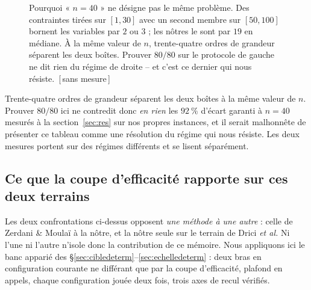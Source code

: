 \documentclass[11pt,a4paper]{article}
\theoremstyle{plain}
\theoremstyle{remark}
\newcommand{\confna}{\textsf{\footnotesize[\,sans mesure\,]}}
\begin{document}
\begin{figure}[H]
\centering
{}
\caption{Pourquoi « $n=40$ » ne désigne pas le même problème. Des
contraintes tirées sur $[1,30]$ avec un second membre sur $[50,100]$
bornent les variables par $2$ ou $3$ ; les nôtres le sont par $19$ en
médiane. À la même valeur de $n$, trente-quatre ordres de grandeur séparent
les deux boîtes. Prouver $80/80$ sur le protocole de gauche ne dit rien du
régime de droite -- et c'est ce dernier qui nous résiste.\ \confna}
\label{fig:boite}
\end{figure}

\noindent
Trente-quatre ordres de grandeur séparent les deux boîtes à la même valeur
de $n$. Prouver $80/80$ ici ne contredit donc \emph{en rien} les
$92\ \%$ d'écart garanti à $n=40$ mesurés à la
section~\ref{sec:res} sur nos propres instances, et il serait malhonnête de
présenter ce tableau comme une résolution du régime qui nous résiste. Les
deux mesures portent sur des régimes différents et se lisent séparément.

\subsection{Ce que la coupe d'efficacité rapporte sur ces deux terrains}
\label{sec:littdeterm}

Les deux confrontations ci-dessus opposent \emph{une méthode à une autre} :
celle de Zerdani \& Moulaï à la nôtre, et la nôtre seule sur le terrain de
Drici \emph{et al.} Ni l'une ni l'autre n'isole donc la contribution de ce
mémoire. Nous appliquons ici le banc apparié des
§\ref{sec:cibledeterm}--\ref{sec:echelledeterm} : deux bras en configuration
courante ne différant que par la coupe d'efficacité, plafond en appels,
chaque configuration jouée deux fois, trois axes de recul vérifiés.
\end{document}
